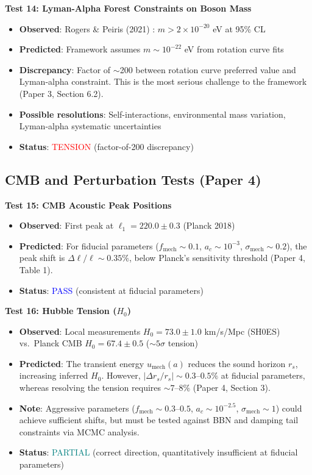 \documentclass[11pt,a4paper]{article}
\newcommand{\umech}{\ensuremath{u_{\mathrm{mech}}}}
\theoremstyle{definition}
\theoremstyle{remark}
\begin{document}
\textbf{Test 14: Lyman-Alpha Forest Constraints on Boson Mass}

\begin{itemize}[leftmargin=*, itemsep=0.1em]
\item \textbf{Observed}: Rogers \& Peiris (2021) \cite{RogersPeiris2021}: $m > 2 \times 10^{-20}$ eV at 95\% CL
\item \textbf{Predicted}: Framework assumes $m \sim 10^{-22}$ eV from rotation curve fits
\item \textbf{Discrepancy}: Factor of $\sim$200 between rotation curve preferred value and Lyman-alpha constraint. This is the most serious challenge to the framework (Paper 3, Section 6.2).
\item \textbf{Possible resolutions}: Self-interactions, environmental mass variation, Lyman-alpha systematic uncertainties
\item \textbf{Status}: \textcolor{red}{TENSION} (factor-of-200 discrepancy)
\end{itemize}

\subsection{CMB and Perturbation Tests (Paper 4)}
\label{sec:tests_cmb}

\textbf{Test 15: CMB Acoustic Peak Positions}

\begin{itemize}[leftmargin=*, itemsep=0.1em]
\item \textbf{Observed}: First peak at $\ell_1 = 220.0 \pm 0.3$ (Planck 2018) \cite{Planck2018}
\item \textbf{Predicted}: For fiducial parameters ($f_{\mathrm{mech}} \sim 0.1$, $a_c \sim 10^{-3}$, $\sigma_{\mathrm{mech}} \sim 0.2$), the peak shift is $\Delta\ell/\ell \sim 0.35\%$, below Planck's sensitivity threshold (Paper 4, Table 1).
\item \textbf{Status}: \textcolor{blue}{PASS} (consistent at fiducial parameters)
\end{itemize}

\textbf{Test 16: Hubble Tension ($H_0$)}

\begin{itemize}[leftmargin=*, itemsep=0.1em]
\item \textbf{Observed}: Local measurements $H_0 = 73.0 \pm 1.0$ km/s/Mpc (SH0ES) vs.\ Planck CMB $H_0 = 67.4 \pm 0.5$ ($\sim 5\sigma$ tension)
\item \textbf{Predicted}: The transient energy $\umech(a)$ reduces the sound horizon $r_s$, increasing inferred $H_0$. However, $|\Delta r_s/r_s| \sim 0.3$--$0.5\%$ at fiducial parameters, whereas resolving the tension requires $\sim 7$--$8\%$ (Paper 4, Section 3).
\item \textbf{Note}: Aggressive parameters ($f_{\mathrm{mech}} \sim 0.3$--$0.5$, $a_c \sim 10^{-2.5}$, $\sigma_{\mathrm{mech}} \sim 1$) could achieve sufficient shifts, but must be tested against BBN and damping tail constraints via MCMC analysis.
\item \textbf{Status}: \textcolor{teal}{PARTIAL} (correct direction, quantitatively insufficient at fiducial parameters)
\end{itemize}
\end{document}
